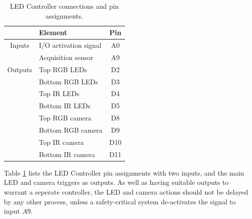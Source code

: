 \documentclass[fleqn,twoside,12pt]{report}
\begin{document}
\begin{table}[h]
	\centering
	\caption{LED Controller connections and pin assignments.}
	\label{tab:LED_tasks}
	\begin{tabular}{clc}
		\toprule
		  			& \textbf{Element} & \textbf{Pin} \\[8pt]
		\midrule
		Inputs 		& I/O activation signal & A0 \\[4pt]
		 			& Acquisition sensor 	& A9 \\[4pt]
				
		Outputs		& Top RGB LEDs			& D2  \\[4pt]
					& Bottom RGB LEDs		& D3  \\[4pt]
					& Top IR LEDs			& D4  \\[4pt]
					& Bottom IR LEDs		& D5  \\[4pt]
				 	& Top RGB camera 		& D8  \\[4pt]
					& Bottom RGB camera		& D9  \\[4pt]
					& Top IR camera			& D10  \\[4pt]
					& Bottom IR camera		& D11  \\[4pt]
		\bottomrule
		
	\end{tabular}
\end{table}
 

Table \ref{tab:LED_tasks} lists the LED Controller pin assignments with two inputs, and the main LED and camera triggers as outputs. As well as having suitable outputs to warrant a seperate controller, the LED and camera actions should not be delayed by any other process, unless a safety-critical system de-activates the signal to input $A9$.
\end{document}
